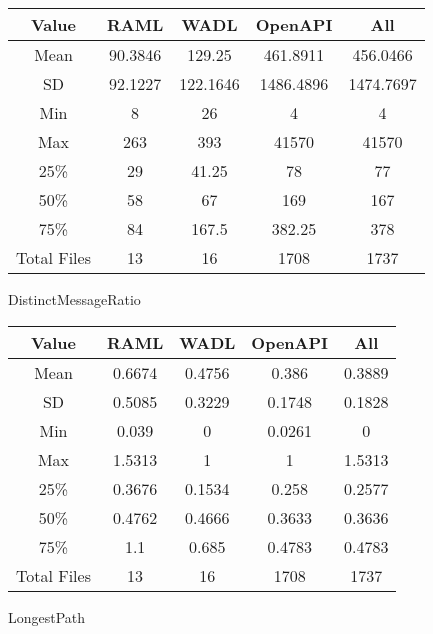 \begin{center}
  \begin{tabular}{ c|c|c|c|c}
    \hline
     \label{table:WSIC}
     Value & RAML & WADL & OpenAPI & All \\ \hline
     Mean &90.3846 &129.25 &461.8911 &456.0466 \\ \hline
     SD &92.1227&122.1646&1486.4896&1474.7697 \\ \hline
     Min &8&26&4&4 \\ \hline
     Max &263&393&41570&41570 \\ \hline
     \rowcolor[HTML]{00FF00} 25\% &29&41.25&78&77 \\ \hline
     \rowcolor[HTML]{7FFF00} 50\% &58&67&169&167 \\ \hline
     \rowcolor[HTML]{FFFF00} 75\% &84&167.5&382.25&378 \\ \hline
     Total Files &13&16&1708&1737 \\ \hline
  \end{tabular}
 \end{center}

DistinctMessageRatio

\begin{center}
  \begin{tabular}{ c|c|c|c|c}
    \hline
     \label{table:WSIC}
     Value & RAML & WADL & OpenAPI & All \\ \hline
     Mean &0.6674 &0.4756 &0.386 &0.3889 \\ \hline
     SD &0.5085&0.3229&0.1748&0.1828 \\ \hline
     Min &0.039&0&0.0261&0 \\ \hline
     Max &1.5313&1&1&1.5313 \\ \hline
     \rowcolor[HTML]{00FF00} 25\% &0.3676&0.1534&0.258&0.2577 \\ \hline
     \rowcolor[HTML]{7FFF00} 50\% &0.4762&0.4666&0.3633&0.3636 \\ \hline
     \rowcolor[HTML]{FFFF00} 75\% &1.1&0.685&0.4783&0.4783 \\ \hline
     Total Files &13&16&1708&1737 \\ \hline
  \end{tabular}
 \end{center}

LongestPath

